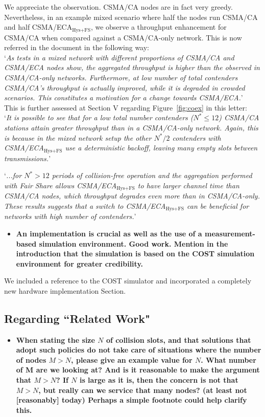 \documentclass[]{article}
\begin{document}
		We appreciate the observation. CSMA/CA nodes are in fact very greedy. Nevertheless, in an example mixed scenario where half the nodes run CSMA/CA and half CSMA/ECA$_{\text{Hys+FS}}$, we observe a throughput enhancement for CSMA/CA when compared against a CSMA/CA-only network. This is now referred in the document in the following way:\\
		
		`\emph{As tests in a mixed network with different proportions of CSMA/CA and CSMA/ECA nodes show, the aggregated throughput is higher than the observed in CSMA/CA-only networks. Furthermore, at low number of total contenders CSMA/CA's throughput is actually improved, while it is degraded in crowded scenarios. This constitutes a motivation for a change towards CSMA/ECA.}'\\
		
		This is further assessed at Section V regarding Figure~\ref{fig:coex} in this letter:\\
		
		`\emph{It is possible to see that for a low total number contenders ($N^{*}\leq 12$) CSMA/CA stations attain greater throughput than in a CSMA/CA-only network. Again, this is because in the mixed network setup the other $N^{*}/2$ contenders with CSMA/ECA$_{\text{Hys+FS}}$ use a deterministic backoff, leaving many empty slots between transmissions.}'
		
		`\emph{...for $N^{*}>12$ periods of collision-free operation and the aggregation performed with Fair Share allows CSMA/ECA$_{\text{Hys+FS}}$ to have larger channel time than CSMA/CA nodes, which throughput degrades even more than in CSMA/CA-only. These results suggests that a switch to CSMA/ECA$_{\text{Hys+FS}}$ can be beneficial for networks with high number of contenders.}'
		
		\begin{itemize}
			\item {\bfseries An implementation is crucial as well as the use of a measurement-based simulation environment. Good work. Mention in the introduction that the simulation is based on the COST simulation environment for greater credibility.}
		\end{itemize}
		
		We included a reference to the COST simulator and incorporated a completely new hardware implementation Section.
		
	\subsection{Regarding ``Related Work"}
		\begin{itemize}
			\item {\bfseries When stating the size $N$ of  collision slots, and that solutions that adopt such policies do not take care of situations where the number of nodes $M > N$, please give an example value for $N$. What number of M are we looking at? And is it reasonable to make the argument that $M > N$? If $N$ is large as it is, then the concern is not that $M > N$, but really can we service that many nodes? (at least not [reasonably] today) Perhaps a simple footnote could help clarify this.}
		\end{itemize}
		
\end{document}
